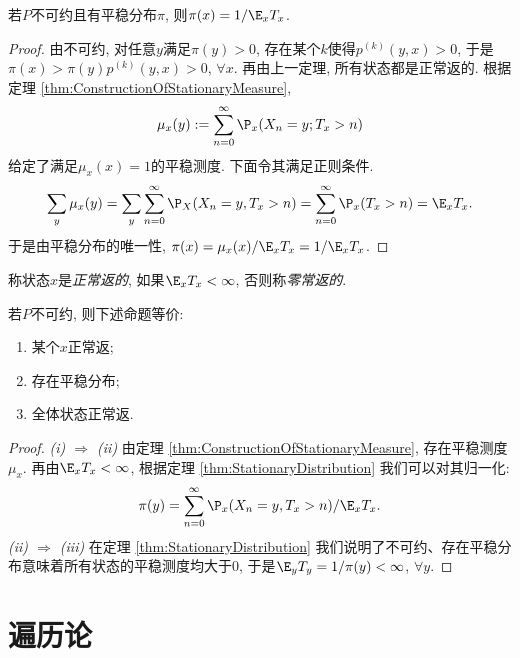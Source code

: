 \documentclass[a4paper, 10pt]{ctexart}
\begin{document}
\begin{theorem}\label{thm:StationaryDistribution}
	若$P$不可约且有平稳分布$\pi$, 则$\pi(x) = 1 / \E_x T_x$. 
\end{theorem}
\begin{proof}
	由不可约, 对任意$y$满足$\pi(y) > 0$, 存在某个$k$使得$p^{(k)}(y, x) > 0$, 于是$\pi(x) > \pi(y) p^{(k)}(y, x) > 0$, $\forall x$. 
	再由上一定理, 所有状态都是正常返的. 
	根据定理 \ref{thm:ConstructionOfStationaryMeasure}, 
	\begin{equation*}
		\mu_x(y) := \sum_{n = 0}^{\infty} \P_x(X_n = y; T_x > n)
	\end{equation*}
	给定了满足$\mu_x(x) = 1$的平稳测度. 
	下面令其满足正则条件. 
	\begin{equation*}
		\sum_y \mu_x(y) 
		= \sum_y \sum_{n=0}^{\infty} \P_X(X_n = y, T_x > n) 
		= \sum_{n = 0}^{\infty} \P_x(T_x > n) 
		= \E_x T_x.
	\end{equation*}
	于是由平稳分布的唯一性, $\pi(x) = \mu_x(x) / \E_x T_x = 1 / \E_x T_x$. 
\end{proof}

称状态$x$是\emph{正常返的}, 如果$\E_x T_x < \infty$, 否则称\emph{零常返的}. 

\begin{theorem}
	若$P$不可约, 则下述命题等价:
	\begin{enumerate}[label=(\roman*)]
		\item 某个$x$正常返;
		\item 存在平稳分布;
		\item 全体状态正常返. 
	\end{enumerate}
\end{theorem}
\begin{proof}
	\emph{(i) $\Rightarrow$ (ii)}
	由定理 \ref{thm:ConstructionOfStationaryMeasure}, 存在平稳测度$\mu_x$. 
	再由$\E_x T_x < \infty$, 根据定理 \ref{thm:StationaryDistribution} 我们可以对其归一化: 
	\begin{equation*}
		\pi(y) = \sum_{n = 0}^{\infty} \P_x(X_n = y, T_x > n) / \E_x T_x.
	\end{equation*}
	\emph{(ii) $\Rightarrow$ (iii)}
	在定理 \ref{thm:StationaryDistribution} 我们说明了不可约、存在平稳分布意味着所有状态的平稳测度均大于$0$, 于是$\E_y T_y = 1 / \pi(y) < \infty$, $\forall y$. 
\end{proof}

\newpage
\section{遍历论}
\end{document}
